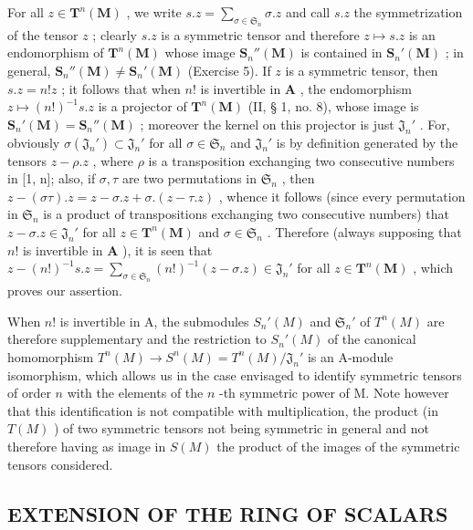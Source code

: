 For all \(z \in \mathbf{T}^n(\mathbf{M})\) , we write \(s.z = \sum_{\sigma \in \mathfrak{S}_n} \sigma.z\) and call \(s.z\) the symmetrization of the tensor \(z\) ; clearly \(s.z\) is a symmetric tensor and therefore \(z \mapsto s.z\) is an endomorphism of \(\mathbf{T}^n(\mathbf{M})\) whose image \(\mathbf{S}_n''(\mathbf{M})\) is contained in \(\mathbf{S}_n'(\mathbf{M})\) ; in general, \(\mathbf{S}_n''(\mathbf{M}) \neq \mathbf{S}_n'( \mathbf{M})\) (Exercise 5). If \(z\) is a symmetric tensor, then \(s.z = n!z\) ; it follows that when \(n!\) is invertible in \(\mathbf{A}\) , the endomorphism \(z \mapsto (n!)^{-1}s.z\) is a projector of \(\mathbf{T}^n(\mathbf{M})\) (II, § 1, no. 8), whose image is \(\mathbf{S}_n'(\mathbf{M}) = \mathbf{S}_n''(\mathbf{M})\) ; moreover the kernel on this projector is just \(\mathfrak{J}_n'\) . For, obviously \(\sigma(\mathfrak{J}_n') \subset \mathfrak{J}_n'\) for all \(\sigma \in \mathfrak{S}_n\) and \(\mathfrak{J}_n'\) is by definition generated by the tensors \(z - \rho.z\) , where \(\rho\) is a transposition exchanging two consecutive numbers in {[}1, n{]}; also, if \(\sigma, \tau\) are two permutations in \(\mathfrak{S}_n\) , then \(z - (\sigma\tau).z = z - \sigma.z + \sigma.(z - \tau.z)\) , whence it follows (since every permutation in \(\mathfrak{S}_n\) is a product of transpositions exchanging two consecutive numbers) that \(z - \sigma.z \in \mathfrak{J}_n'\) for all \(z \in \mathbf{T}^n(\mathbf{M})\) and \(\sigma \in \mathfrak{S}_n\) . Therefore (always supposing that \(n!\) is invertible in \(\mathbf{A}\) ), it is seen that \(z - (n!)^{-1}s.z = \sum_{\sigma \in \mathfrak{S}_n}(n!)^{-1}(z - \sigma.z) \in \mathfrak{J}_n'\) for all \(z \in \mathbf{T}^n(\mathbf{M})\) , which proves our assertion.

When \(n!\) is invertible in A, the submodules \(S_n'(M)\) and \(\mathfrak{S}_n'\) of \(T^n(M)\) are therefore supplementary and the restriction to \(S_n'(M)\) of the canonical homomorphism \(T^n(M) \to S^n(M) = T^n(M)/\mathfrak{J}_n'\) is an A-module isomorphism, which allows us in the case envisaged to identify symmetric tensors of order \(n\) with the elements of the \(n\) -th symmetric power of M. Note however that this identification is not compatible with multiplication, the product (in \(T(M)\) ) of two symmetric tensors not being symmetric in general and not therefore having as image in \(S(M)\) the product of the images of the symmetric tensors considered.

\subsection{EXTENSION OF THE RING OF SCALARS}

